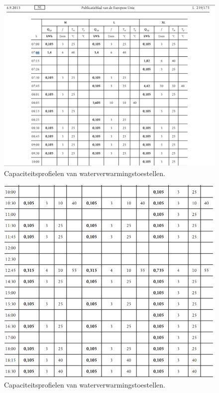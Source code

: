 \documentclass[a4paper,10pt]{article}
\begin{document}
\begin{appendices}
  
\begin{figure}[H]
\centering
\includegraphics[width=1\columnwidth]{pictures/Profile_M1.png}
\caption[Short title]{Capaciteitsprofielen van waterverwarmingstoestellen.}
\label{fig:ff15}\end{figure}
  
\begin{figure}[H]
\centering
\includegraphics[width=1\columnwidth]{pictures/Profile_M2.png}
\caption[Short title]{Capaciteitsprofielen van waterverwarmingstoestellen.}
\label{fig:ff16}\end{figure}


\end{appendices}
\end{document}
